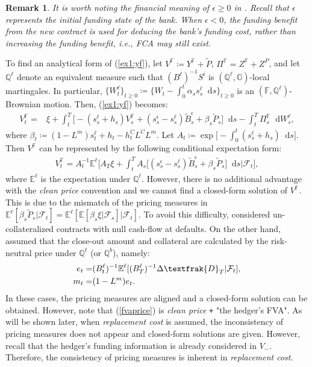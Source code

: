 \documentclass[a4paper, 11pt]{article}              %
\numberwithin{equation}{section}
\theoremstyle{plain}
\newcommand{\1}{\mathds{1}}
\newcommand{\calF}{\mathcal{F}}
\newcommand{\frD}{\textfrak{D}}
\newcommand{\Bt}{\tilde{B}}
\newcommand{\pt}{\tilde{P}}
\newcommand{\dsE}{\mathbb{E}}
\newcommand{\dsF}{\mathbb{F}}
\newcommand{\dsQ}{\mathbb{Q}}
\newcommand{\dsG}{\mathbb{G}}
\theoremstyle{plain}
\theoremstyle{definition}
\newtheorem{remark}[thm]{Remark} %
\theoremstyle{plain}
\newtheorem{remark}{Remark}
\newcommand*\df{\mathop{}\!\mathrm{d}}
\begin{document}
\begin{remark}
 It is worth noting the financial meaning of $\epsilon \geq0$ in
 . Recall that $\epsilon$ represents the initial funding state
 of the bank. When $\epsilon <0$, the funding benefit from the new contract is used for
 deducing the bank's funding cost, rather than increasing the funding benefit, i.e.,
 FCA may still exist.
\end{remark}
To find an analytical form of (\ref{ex1:yf}), let
$V^\dsF \coloneqq Y^\dsF + \pt$, $\Pi^\dsF = Z^\dsF + Z^P$, and let $\dsQ^\ell$
denote an equivalent measure such that $(B^\ell)^{-1}S^i$ is $(\dsQ^\ell, \dsG)$-local
martingales. In particular, $\{W^\ell_t\}_{t\geq 0 } \coloneqq \big\{W_t
-\int_{0}^{t}\alpha_ss^\ell_s\df s \big\}_{t\geq 0 }$
is an $(\dsF, \dsQ^\ell)$-Brownian motion. Then, (\ref{ex1:yf}) becomes:
\begin{align}
  V^\dsF_t =&\xi
  + \int_{t}^{T}\Big[-(s^\ell_s+h_s)V^\dsF_s +(s^\epsilon_s-s^\ell_s)\Bt^\epsilon_s+\beta_s \pt_s\Big]\df s
  -\int_{t}^{T}\Pi^\dsF_s \df W^\ell_s,\nonumber 
\end{align}
where $\beta_t\coloneqq (1-L^m)s^\ell_t + h_t-h^C_tL^CL^m$.
Let $A_t \coloneqq \exp{\big[-\int_{0}^{t}(s^\ell_s+h_s) \df s\big]}$. Then $V^\dsF$
can be represented by the following conditional expectation form:
\begin{align}
  V^\dsF_t = A^{-1}_t\dsE^\ell\bigg[A_T\xi +
  \int_{t}^{T}A_s\big[(s^\epsilon_s-s^\ell_s)\Bt^\epsilon_s+\beta_s \pt_s\big]
  \df s\bigg|\calF_t\bigg], \label{analyticform}
\end{align}
where $\dsE^\ell$ is the expectation under $\dsQ^\ell$.  However, there is no
additional advantage
with the \textit{clean price} convention and we cannot find a closed-form
solution of $V^\dsF$. This is due to the mismatch of the pricing measures in
$\dsE^\ell[\beta_s \pt_s\big|\calF_t] = \dsE^\ell[ \dsE[\beta_s\xi|\calF_s]\big|\calF_t]$.
To avoid this difficulty, \cite{brigo2017funding} considered un-collateralized
contracts with null cash-flow at defaults. On the other hand,
\cite{bichuch2017arbitrage} assumed that the close-out amount and collateral are
calculated by the risk-neutral price under $\dsQ^\ell$ (or $\dsQ^b$), namely:
\begin{align}
  e_t =& (B^\ell_t)^{-1}\dsE^{\ell}[(B^\ell_T)^{-1}\Delta \frD_T|\calF_t], \label{fvaprice}\\
  m_t =& (1-L^m)e_t. 
\end{align}
In these cases, the pricing measures are aligned and a closed-form solution can
be obtained. However, note that (\ref{fvaprice}) is
  \textit{clean price} \texttt{+} "the hedger's FVA".
As will be shown later, when \textit{replacement cost} is assumed, the
inconsistency of pricing measures does not appear and closed-form solutions are
given. However, recall that the hedger's funding information is already
considered in $V_-$. Therefore, the consistency of
pricing measures is inherent  in \textit{replacement cost}.
\end{document}
